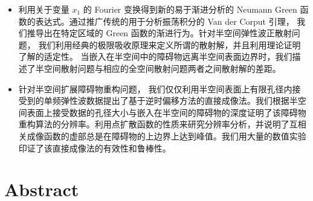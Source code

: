 \begin{itemize}
	\item  利用关于变量 $x_1$ 的 Fourier 变换得到新的易于渐进分析的 Neumann Green 函数的表达式。通过推广传统的用于分析振荡积分的 Van der Corput 引理， 我们推导出在特定区域的 Green 函数的渐进行为。针对半空间弹性波正散射问题， 我们利用经典的极限吸收原理来定义所谓的散射解，并且利用理论证明了解的适定性。 当嵌入在半空间中的障碍物远离半空间表面边界时，我们描述了半空间散射问题与相应的全空间散射问题两者之间散射解的差距。
	
	\item 针对半空间扩展障碍物重构问题， 我们仅仅利用半空间表面上有限孔径内接受到的单频弹性波数据提出了基于逆时偏移方法的直接成像法。我们根据半空间表面上接受数据的孔径大小与嵌入在半空间的障碍物的深度证明了该障碍物重构算法的分辨率。利用点扩散函数的性质来研究分辨率分析，并说明了互相关成像函数的虚部总是在障碍物的上边界上达到峰值。我们用大量的数值实验印证了该直接成像法的有效性和鲁棒性。
\end{itemize}

\chapter*{Abstract}%

